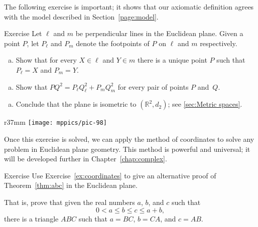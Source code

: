 The following exercise is important;
it shows that our axiomatic definition agrees with the model described in Section~\ref{page:model}.


\begin{thm}{Exercise}\label{ex:coordinates} 
Let $\ell$ and $m$ be perpendicular lines in the Euclidean plane.
Given a point $P$, let $P_\ell$ and $P_m$ denote the footpoints of $P$ on $\ell$ and $m$ respectively.

\begin{enumerate}[(a)]
\item Show that for every $X\in \ell$ and $Y\in m$ there is a unique point $P$ such that $P_\ell=X$ and $P_m=Y$.
\end{enumerate}

\begin{enumerate}[(a)]\addtocounter{enumi}{1}
\item
Show that 
$PQ^2=P_\ell Q_\ell^2+P_mQ_m^2$
for every pair of points $P$ and~$Q$.
\end{enumerate}

\begin{enumerate}[(a)]\addtocounter{enumi}{2}
\item Conclude that the plane is isometric to $(\mathbb{R}^2,d_2)$; see \ref{sec:Metric spaces}.
\end{enumerate}

\end{thm}

\begin{wrapfigure}{r}{37mm}
\centering
\texttt{[image: mppics/pic-98]}
\end{wrapfigure}

Once this exercise is solved, we can apply 
the method of coordinates
to solve any problem in Euclidean plane geometry.
This method is powerful and universal;
it will be developed further in Chapter~\ref{chap:complex}.

\begin{thm}{Exercise}\label{ex:abc}
Use Exercise~\ref{ex:coordinates}
to give an alternative proof of Theorem~\ref{thm:abc} in the Euclidean plane.

That is, prove that given the real numbers $a$, $b$, and $c$ such that 
 $$0<a\le b\le c\le a+b,$$
there is a triangle $ABC$
such that $a=BC$, $b=CA$, and $c=AB$.
\end{thm} 


